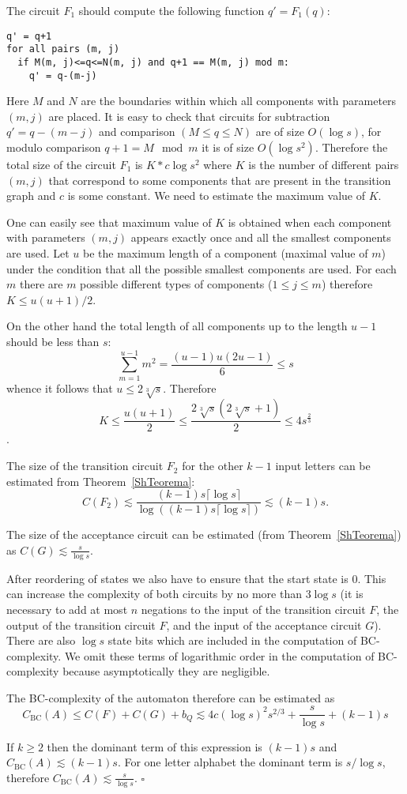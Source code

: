 \documentclass[copyright, creativecommons]{eptcs}
\newcommand{\qed}{$\square$}
\newcommand{\cBC}{C_\mathrm{BC}}
\newenvironment{proof}[1][Proof]{\begin{trivlist}
\item[\hskip \labelsep {\bfseries #1}]}{\end{trivlist}}
\begin{document}
\begin{proof}
The circuit $F_1$ should compute the following function $q' = F_1(q)$:
\begin{verbatim}
q' = q+1
for all pairs (m, j)
  if M(m, j)<=q<=N(m, j) and q+1 == M(m, j) mod m:
    q' = q-(m-j)
\end{verbatim}

Here $M$ and $N$ are the boundaries within which all components with parameters $(m, j)$ are placed.
It is easy to check that circuits for subtraction $q'=q-(m-j)$ and comparison $(M\leq q\leq N)$ are of size $O(\log{s})$,
for modulo comparison $q+1=M \mod{m}$ it is of size $O(\log{s}^2)$. Therefore
the total size of the circuit $F_1$ is
$K*c\log{s}^2$
where $K$ is the number of different pairs $(m, j)$ that correspond to some components
that are present in the transition graph and $c$
is some constant. We need to estimate the maximum value of $K$.

One can easily see that maximum value of $K$ is obtained when
each component with parameters $(m, j)$ appears exactly once and all the smallest components are used.
Let $u$ be the maximum length of a component (maximal value of $m$) under the condition
that all the possible smallest components are used.
For each $m$ there are $m$ possible different types of components ($1\leq j\leq m$) therefore 
$K\leq u(u+1)/2$. 

On the other hand the total length of all components up to the length $u-1$ should be less than $s$:
$$\sum_{m=1}^{u-1} m^2=\frac{(u-1)u(2u-1)}{6}\leq s$$
whence it follows that $u\leq 2\sqrt[3]{s}$.
Therefore
$$K\leq\frac{u(u+1)}{2}\leq\frac{2\sqrt[3]{s}(2\sqrt[3]{s}+1)}{2}\leq 4s^\frac{2}{3}$$.

The size of the transition circuit $F_2$ for the other $k-1$ input letters can be estimated from Theorem~\ref{ShTeorema}:
$$C(F_2)\lesssim\frac{(k-1)s\lceil\log{s}\rceil}{\log ((k-1)s\lceil\log{s}\rceil)}\lesssim (k-1)s.$$

The size of the acceptance circuit can be estimated (from Theorem~\ref{ShTeorema}) as
$C(G)\lesssim \frac{s}{\log{s}}$.

After reordering of states we also have to ensure that the start state is 0. This
can increase the complexity of both circuits by no more than $3\log{s}$ (it is
necessary to add at most $n$ negations to the input of the transition circuit $F$, the output of the transition
circuit $F$, and the input of the acceptance circuit $G$). There are also
$\log{s}$ state bits which are included in the computation of BC-complexity.
We omit these terms of logarithmic order in the computation of BC-complexity because
asymptotically they are negligible.

The BC-complexity of the automaton therefore can be estimated as
$$\cBC(A)\leq C(F)+C(G)+b_Q\lesssim 4c(\log s)^2s^{2/3}+\frac{s}{\log s} + (k-1)s$$

If $k\geq 2$ then the dominant term of this expression is $(k-1)s$ and $\cBC(A)\lesssim (k-1)s$.
For one letter alphabet the dominant term is $s/\log{s}$, therefore $\cBC(A)\lesssim \frac{s}{\log s}$.
\qed
\end{proof}
\end{document}
